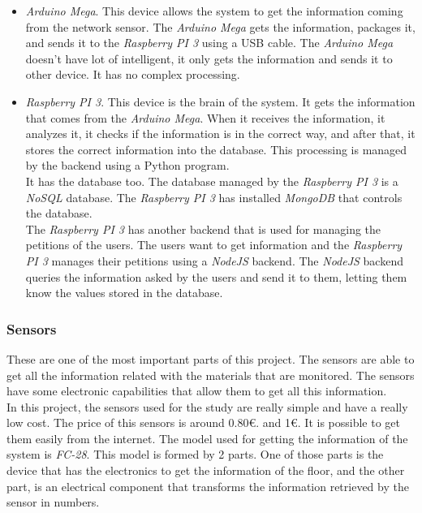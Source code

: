 \begin{itemize}

\item \textit{Arduino Mega}. This device allows the system to get the information coming from the network sensor. The \textit{Arduino Mega} gets the information, packages it, and sends it to the \textit{Raspberry PI 3} using a USB cable. The \textit{Arduino Mega} doesn't have lot of intelligent, it only gets the information and sends it to other device. It has no complex processing.\\

\item \textit{Raspberry PI 3}. This device is the brain of the system. It gets the information that comes from the \textit{Arduino Mega}. When it receives the information, it analyzes it, it checks if the information is in the correct way, and after that, it stores the correct information into the database. This processing is managed by the backend using a Python program.\\

It has the database too. The database managed by the \textit{Raspberry PI 3} is a \textit{NoSQL} database. The \textit{Raspberry PI 3} has installed \textit{MongoDB} that controls the database.\\

The \textit{Raspberry PI 3} has another backend that is used for managing the petitions of the users. The users want to get information and the \textit{Raspberry PI 3} manages their petitions using a \textit{NodeJS} backend. The \textit{NodeJS} backend queries the information asked by the users and send it to them, letting them know the values stored in the database.

\end{itemize}

\subsubsection{Sensors}

These are one of the most important parts of this project. The sensors are able to get all the information related with the materials that are monitored. The sensors have some electronic capabilities that allow them to get all this information.\\

In this project, the sensors used for the study are really simple and have a really low cost. The price of this sensors is around 0.80\euro . and 1\euro . It is possible to get them easily from the internet. The model used for getting the information of the system is \textit{FC-28}. This model is formed by 2 parts. One of those parts is the device that has the electronics to get the information of the floor, and the other part, is an electrical component that transforms the information retrieved by the sensor in numbers.\\

